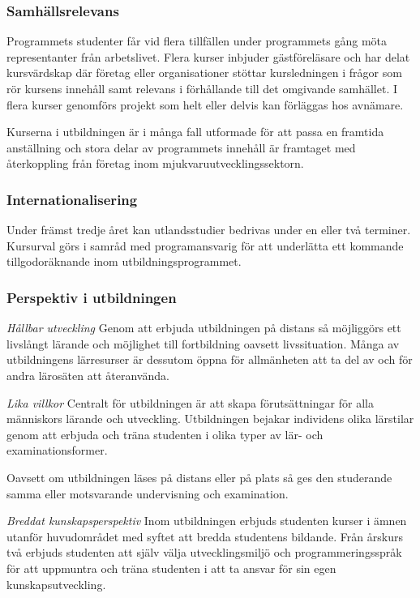 \documentclass[swedish]{LnuCmThesis}
\begin{document}
\subsubsection*{Samhällsrelevans}
Programmets studenter får vid flera tillfällen under programmets gång möta representanter från arbetslivet. Flera kurser inbjuder gästföreläsare och har delat kursvärdskap där företag eller organisationer stöttar kursledningen i frågor som rör kursens innehåll samt relevans i förhållande till det omgivande samhället. I flera kurser genomförs projekt som helt eller delvis kan förläggas hos avnämare.

Kurserna i utbildningen är i många fall utformade för att passa en framtida anställning och stora delar av programmets innehåll är framtaget med återkoppling från företag inom mjukvaruutvecklingssektorn.

\subsubsection*{Internationalisering}
Under främst tredje året kan utlandsstudier bedrivas under en eller två terminer. Kursurval görs i samråd med programansvarig för att underlätta ett kommande tillgodoräknande inom utbildningsprogrammet.

\subsubsection*{Perspektiv i utbildningen}

\textit{Hållbar utveckling}
Genom att erbjuda utbildningen på distans så möjliggörs ett livslångt lärande och möjlighet till fortbildning oavsett livssituation. Många av utbildningens lärresurser är dessutom öppna för allmänheten att ta del av och för andra lärosäten att återanvända.

\textit{Lika villkor}
Centralt för utbildningen är att skapa förutsättningar för alla människors lärande och utveckling. Utbildningen bejakar individens olika lärstilar genom att erbjuda och träna studenten i olika typer av lär- och examinationsformer. 

Oavsett om utbildningen läses på distans eller på plats så ges den studerande samma eller motsvarande undervisning och examination.

\textit{Breddat kunskapsperspektiv}
Inom utbildningen erbjuds studenten kurser i ämnen utanför huvudområdet med syftet att bredda studentens bildande. 
Från årskurs två erbjuds studenten att själv välja utvecklingsmiljö och programmeringsspråk för att uppmuntra och träna studenten i att ta ansvar för sin egen kunskapsutveckling.
\end{document}
